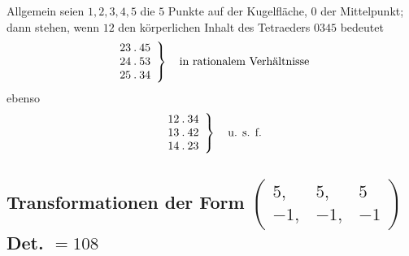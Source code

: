 Allgemein seien $1,2,3,4,5$ die $5$ Punkte auf der Kugelfläche, $0$ der Mittelpunkt; dann stehen, wenn $12$ den körperlichen Inhalt des Tetraeders $0345$ bedeutet
\[
\left.\begin{array}{c}23\mathbin{.}45\\24\mathbin{.}53\\25\mathbin{.}34\end{array}\right\}
\quad\text{in rationalem Verhältnisse}
\]
ebenso
\[
\left.\begin{array}{c}12\mathbin{.}34\\13\mathbin{.}42\\14\mathbin{.}23\end{array}\right\}\quad\text{u. s. f.}
\]

%
\subsection*{Transformationen der Form $\left(\begin{smallmatrix}5,&5,&5\\-1,&-1,&-1\end{smallmatrix}\right)$ Det. $=108$}
